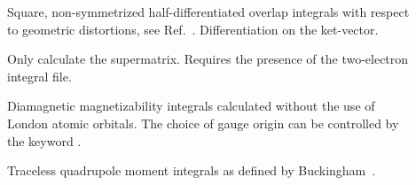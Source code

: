 \begin{description}
%

\item[] Square, non-symmetrized half-differentiated
overlap integrals with respect to geometric distortions, see
Ref.~\cite{klbpjhjajjothjcp97}. Differentiation on the ket-vector.


\item[] Only calculate the supermatrix. Requires the
presence of the two-electron integral file.

\item[] Diamagnetic magnetizability integrals calculated
without the use of London atomic orbitals. The choice of gauge
origin
can be controlled by the keyword .


\item[] Traceless quadrupole moment integrals as defined by Buckingham~\cite{adbacp12}.


\end{description}
